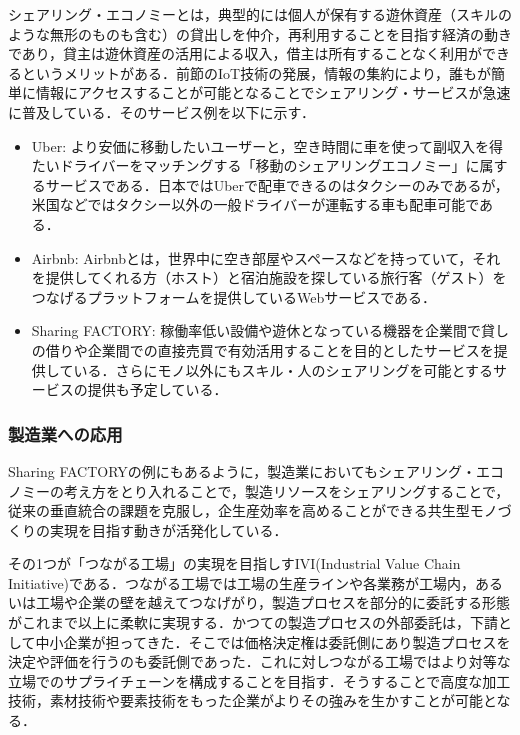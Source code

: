 シェアリング・エコノミーとは，典型的には個人が保有する遊休資産（スキルのような無形のものも含む）の貸出しを仲介，再利用することを目指す経済の動きであり，貸主は遊休資産の活用による収入，借主は所有することなく利用ができるというメリットがある\cite{Soumu-sharing}．前節のIoT技術の発展，情報の集約により，誰もが簡単に情報にアクセスすることが可能となることでシェアリング・サービスが急速に普及している．そのサービス例を以下に示す．

\begin{itemize}
\tightlist
\item
  Uber\cite{uber}:
  より安価に移動したいユーザーと，空き時間に車を使って副収入を得たいドライバーをマッチングする「移動のシェアリングエコノミー」に属するサービスである．日本ではUberで配車できるのはタクシーのみであるが，米国などではタクシー以外の一般ドライバーが運転する車も配車可能である．
\item
  Airbnb\cite{airbnb}:
  Airbnbとは，世界中に空き部屋やスペースなどを持っていて，それを提供してくれる方（ホスト）と宿泊施設を探している旅行客（ゲスト）をつなげるプラットフォームを提供しているWebサービスである．
\item
  Sharing FACTORY\cite{sharering-factory}:
  稼働率低い設備や遊休となっている機器を企業間で貸しの借りや企業間での直接売買で有効活用することを目的としたサービスを提供している．さらにモノ以外にもスキル・人のシェアリングを可能とするサービスの提供も予定している．
\end{itemize}

\hypertarget{ux88fdux9020ux696dux3078ux306eux5fdcux7528}{%
\subsubsection{製造業への応用}\label{ux88fdux9020ux696dux3078ux306eux5fdcux7528}}

Sharing
FACTORYの例にもあるように，製造業においてもシェアリング・エコノミーの考え方をとり入れることで，製造リソースをシェアリングすることで，従来の垂直統合の課題を克服し，企生産効率を高めることができる共生型モノづくりの実現を目指す動きが活発化している\cite{IVI}\cite{Hitachi-csmfg}．

その1つが「つながる工場」の実現を目指しすIVI(Industrial Value Chain
Initiative)である\cite{IVI}．つながる工場では工場の生産ラインや各業務が工場内，あるいは工場や企業の壁を越えてつなげがり，製造プロセスを部分的に委託する形態がこれまで以上に柔軟に実現する．かつての製造プロセスの外部委託は，下請として中小企業が担ってきた．そこでは価格決定権は委託側にあり製造プロセスを決定や評価を行うのも委託側であった．これに対しつながる工場ではより対等な立場でのサプライチェーンを構成することを目指す．そうすることで高度な加工技術，素材技術や要素技術をもった企業がよりその強みを生かすことが可能となる．

